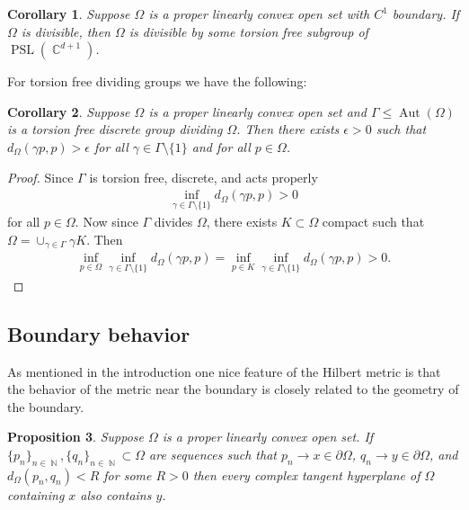 \documentclass[12pt]{amsart}
\theoremstyle{plain}
\newtheorem{proposition}{Proposition}[section]
\newtheorem{corollary}[proposition]{Corollary}
\theoremstyle{definition}
\theoremstyle{remark}
\begin{document}
\begin{corollary}
\label{cor:fin_gen}
Suppose $\Omega$ is a proper linearly convex open set with $C^1$ boundary. If $\Omega$ is divisible, then $\Omega$ is divisible by some torsion free subgroup of $\operatorname{PSL}(\operatorname{\mathbb{C}}^{d+1})$.
\end{corollary}

For torsion free dividing groups we have the following:

\begin{corollary}
\label{cor:inj_rad}
Suppose $\Omega$ is a proper linearly convex open set and $\Gamma \leq \operatorname{Aut}(\Omega)$ is a torsion free discrete group dividing $\Omega$. Then there exists $\epsilon >0$ such that $d_{\Omega}(\gamma p, p) > \epsilon$ for all $\gamma\in \Gamma \setminus \{1\}$ and for all $p \in \Omega$.
\end{corollary}

\begin{proof}
Since $\Gamma$ is torsion free, discrete, and acts properly
\begin{align*}
\inf_{\gamma \in \Gamma \setminus \{1\} } d_{\Omega}(\gamma p, p) >0
\end{align*}
for all $p \in \Omega$. Now since $\Gamma$ divides $\Omega$, there exists $K \subset \Omega$ compact such that $\Omega = \cup_{\gamma \in \Gamma} \gamma K$. Then
\begin{align*}
\inf_{p \in \Omega} \inf_{\gamma \in \Gamma \setminus \{1\}} d_{\Omega}(\gamma p,p) = \inf_{p \in K} \inf_{\gamma \in \Gamma \setminus \{1\}} d_{\Omega}(\gamma p,p) >0.
\end{align*}
\end{proof}

\subsection{Boundary behavior} As mentioned in the introduction one nice feature of the Hilbert metric is that the behavior of the metric near the boundary is closely related to the geometry of the boundary.

\begin{proposition}
\label{prop:bd_behav}
Suppose $\Omega$ is a proper linearly convex open set. If $\{p_n\}_{n \in \operatorname{\mathbb{N}}},\{ q_n\}_{n \in \operatorname{\mathbb{N}}} \subset \Omega$ are sequences  such that $p_n \rightarrow x \in \partial \Omega$, $q_n \rightarrow y \in \partial \Omega$, and $d_{\Omega}(p_n,q_n) < R$ for some $R>0$ then every complex tangent hyperplane of $\Omega$ containing $x$ also contains $y$.
\end{proposition}
\end{document}
